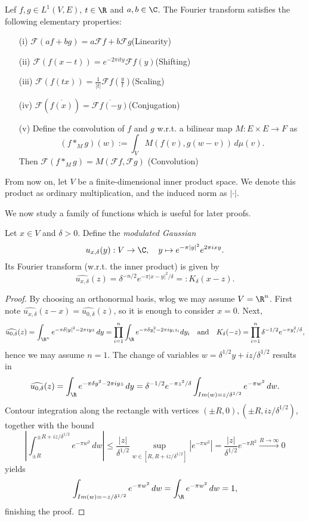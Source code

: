 \begin{lemma}
  \label{lem:fourier-prop}
  \lean{}
Lef $f,g\in L^1(V,E)$, $t\in\R$ and $a,b\in\C$. The Fourier transform satisfies the following elementary properties:
\begin{enumerate}
  \item[(i)] $\mathcal F(af+bg)=a\mathcal Ff+b\mathcal Fg$\hfill(Linearity)
  \item[(ii)] $\mathcal F(f(x-t)) = e^{-2\pi i ty}\mathcal F f(y)$\hfill (Shifting)
  \item[(iii)] $\mathcal F(f(tx)) = \frac1{|t|}\mathcal F f(\frac yt)$\hfill (Scaling)
  \item[(iv)] $\mathcal F(\overline{f(x)}) = \overline{\mathcal Ff(-y)}$\hfill (Conjugation)
  \item[(v)] Define the convolution of $f$ and $g$ w.r.t. a bilinear map $M:E\times E\to F$ as
             $$(f\ast_Mg)(w):=\int_VM(f(v),g(w-v))\,d\mu(v).$$ Then
             $\mathcal F(f\ast_M g) =M(\mathcal Ff,\mathcal Fg)$ \hfill (Convolution)
\end{enumerate}
\end{lemma}
From now on, let $V$ be a finite-dimensional inner product space.
We denote this product as ordinary multiplication, and the induced norm as $|\cdot|.$

We now study a family of functions which is useful for later proofs.
\begin{lemma}
\label{lem:fourier-gaussian}
\leanok
Let $x\in V$ and $\delta>0$. Define the \emph{modulated Gaussian}
$$u_{x,\delta}(y):V\to\C,\quad y\mapsto e^{-\pi|y|^2}e^{2\pi i x y}.$$
Its Fourier transform (w.r.t. the inner product) is given by
$$\widehat{u_{x,\delta}}(z)=\delta^{-n/2}e^{-\pi|x-y|^2/\delta}=:K_\delta(x-z).$$
\end{lemma}
\begin{proof}
  \leanok
  By choosing an orthonormal basis, wlog we may assume $V=\R^n$.
  First note $\widehat{u_{x,\delta}}(z-x)=\widehat{u_{0,\delta}}(z)$, so it is enough to consider $x=0$.
  Next, $$\widehat{u_{0,\delta}}(z)=\int_{\R^n}e^{-\pi\delta|y|^2-2\pi iyz}\,dy=
  \prod_{i=1}^n\int_{\R}e^{-\pi\delta y_i^2-2\pi iy_iz_i}dy_i\quad\text{and}\quad
  K_\delta(-z)=\prod_{i=1}^n\delta^{-1/2}e^{-\pi y_i^2/\delta},$$ hence we may assume $n=1$.
  The change of variables $w=\delta^{1/2}y+iz/\delta^{1/2}$ results in
  $$\widehat{u_{0,\delta}}(z)=\int_{\R} e^{-\pi\delta y^2-2\pi i y z}\,dy=
  \delta^{-1/2}e^{-\pi z^2/\delta}\int_{Im(w)=z/\delta^{1/2}}e^{-\pi w^2}\,dw.$$
  Contour integration along the rectangle with vertices $(\pm R,0),(\pm R,iz/\delta^{1/2})$, together
  with the bound $$\left|\int_{\pm R}^{\pm R+iz/\delta^{1/2}}e^{-\pi w^2}\,dw\right|\leq
  \frac{|z|}{\delta^{1/2}}\sup_{w\in[R,R+iz/\delta^{1/2}]}|e^{-\pi w^2}|=
  \frac{|z|}{\delta^{1/2}}e^{-\pi R^2}\xrightarrow{R\to\infty}0$$
  yields
  $$\int_{Im(w)=-z/\delta^{1/2}}e^{-\pi w^2}\,dw=
  \int_{\R} e^{-\pi w^2}\,dw=1,$$ finishing the proof.
\end{proof}

